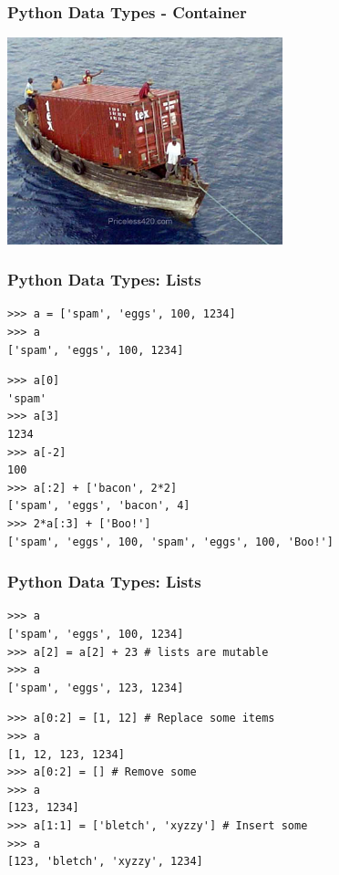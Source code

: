 \documentclass[t,10pt,compress=false,usepdftitle=false]{beamer}
\begin{document}
\begin{frame}[fragile]
    \frametitle{Python Data Types - Container}
    \begin{center}
      \includegraphics[width=0.6\textwidth]{container.jpg}
    \end{center}
\end{frame}


\begin{frame}[fragile]
    \frametitle{Python Data Types: Lists}
    \begin{myColorBox}{0.9}{}
\begin{verbatim}
>>> a = ['spam', 'eggs', 100, 1234]
>>> a
['spam', 'eggs', 100, 1234]
\end{verbatim}
    \end{myColorBox}
    \pause
    \begin{myColorBox}{0.9}{}
\begin{verbatim}
>>> a[0]
'spam'
>>> a[3]
1234
>>> a[-2]
100
>>> a[:2] + ['bacon', 2*2]
['spam', 'eggs', 'bacon', 4]
>>> 2*a[:3] + ['Boo!']
['spam', 'eggs', 100, 'spam', 'eggs', 100, 'Boo!']
\end{verbatim}
    \end{myColorBox}
\end{frame}

\begin{frame}[fragile]
    \frametitle{Python Data Types: Lists}
    \begin{myColorBox}{0.9}{}
\begin{verbatim}
>>> a
['spam', 'eggs', 100, 1234]
>>> a[2] = a[2] + 23 # lists are mutable
>>> a
['spam', 'eggs', 123, 1234]
\end{verbatim}
    \end{myColorBox}
    \pause
    \begin{myColorBox}{0.9}{}
\begin{verbatim}
>>> a[0:2] = [1, 12] # Replace some items
>>> a
[1, 12, 123, 1234]
>>> a[0:2] = [] # Remove some
>>> a
[123, 1234]
>>> a[1:1] = ['bletch', 'xyzzy'] # Insert some
>>> a
[123, 'bletch', 'xyzzy', 1234]
\end{verbatim}
    \end{myColorBox}
\end{frame}
\end{document}
